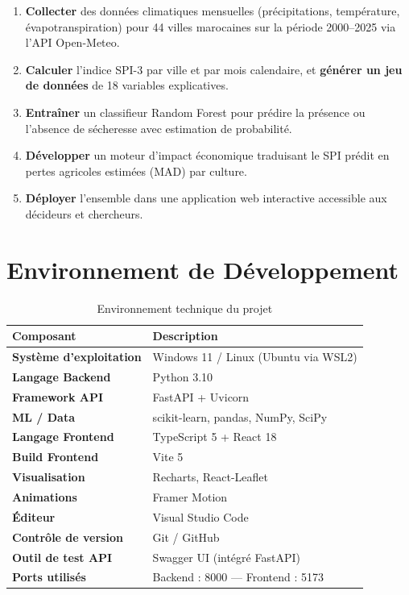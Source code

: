 \documentclass[12pt,a4paper]{report}
\begin{document}
\begin{enumerate}
    \item \textbf{Collecter} des données climatiques mensuelles (précipitations, température, évapotranspiration) pour 44 villes marocaines sur la période 2000--2025 via l'API Open-Meteo.
    \item \textbf{Calculer} l'indice SPI-3 par ville et par mois calendaire, et \textbf{générer un jeu de données} de 18 variables explicatives.
    \item \textbf{Entraîner} un classifieur Random Forest pour prédire la présence ou l'absence de sécheresse avec estimation de probabilité.
    \item \textbf{Développer} un moteur d'impact économique traduisant le SPI prédit en pertes agricoles estimées (MAD) par culture.
    \item \textbf{Déployer} l'ensemble dans une application web interactive accessible aux décideurs et chercheurs.
\end{enumerate}

\chapter{Environnement de Développement}

\begin{table}[H]
    \centering
    \begin{tabular}{>{\bfseries}p{4.5cm}p{9cm}}
        \toprule
        Composant & Description \\
        \midrule
        Système d'exploitation & Windows 11 / Linux (Ubuntu via WSL2) \\
        Langage Backend & Python 3.10 \\
        Framework API & FastAPI + Uvicorn \\
        ML / Data & scikit-learn, pandas, NumPy, SciPy \\
        Langage Frontend & TypeScript 5 + React 18 \\
        Build Frontend & Vite 5 \\
        Visualisation & Recharts, React-Leaflet \\
        Animations & Framer Motion \\
        Éditeur & Visual Studio Code \\
        Contrôle de version & Git / GitHub \\
        Outil de test API & Swagger UI (intégré FastAPI) \\
        Ports utilisés & Backend : 8000 — Frontend : 5173 \\
        \bottomrule
    \end{tabular}
    \caption{Environnement technique du projet}
\end{table}
\end{document}
